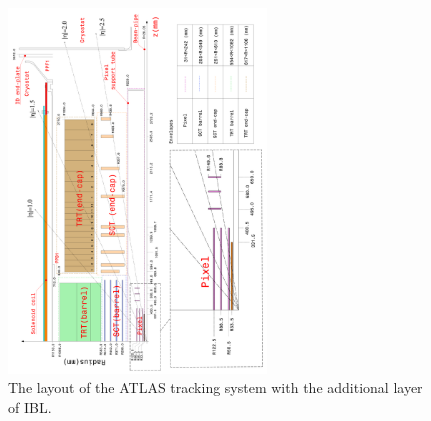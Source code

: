 
\begin{figure}
\begin{center}
 \includegraphics[width=0.61\textwidth, angle = -90 ]{Images/ibl_paper/chapter03_Overview/NewID.pdf}
\caption{The layout of the ATLAS tracking system with the additional layer of IBL. }
\label{fig:NewID}
\end{center}
\end{figure}




